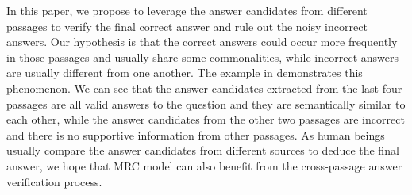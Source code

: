 %


In this paper, we propose to leverage the answer candidates from different passages to verify the final correct answer and rule out the noisy incorrect answers. 
Our hypothesis is that the correct answers could occur more frequently in those passages and usually share some commonalities, while incorrect answers are usually different from one another. The example in  demonstrates this phenomenon. We can see that the answer candidates extracted from the last four passages are all valid answers to the question and they are semantically similar to each other, while the answer candidates from the other two passages are incorrect and there is no supportive information from other passages. As human beings usually compare the answer candidates from different sources to deduce the final answer, we hope that MRC model can also benefit from the cross-passage answer verification process.


